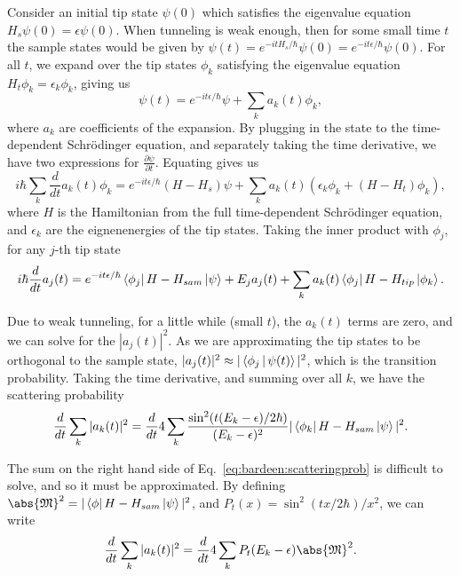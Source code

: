 \sloppy Consider an initial tip state $\psi(0)$ which satisfies the eigenvalue equation $H_{s}\psi(0) = \epsilon \psi(0)$. When tunneling is weak enough, then for some small time $t$ the sample states would be given by $\psi(t) = e^{-itH_{s}/\hbar} \psi(0) = e^{-it\epsilon/\hbar} \psi(0) $. For all $t$, we expand over the tip states $\phi_k$ satisfying the eigenvalue equation $H_{t}\phi_k = \epsilon_k \phi_k$, giving us
\begin{equation}
\psi(t) = e^{-it\epsilon/\hbar} \psi + \sum_k a_k(t) \phi_k,
\end{equation}
where $a_k$ are coefficients of the expansion. By plugging in the state to the time-dependent Schr\"odinger equation, and separately taking the time derivative, we have two expressions for $\frac{\partial \psi}{\partial t}$. Equating gives us
\begin{equation}
i\hbar \sum_k \frac{d}{dt} a_k(t) \phi_k = e^{-it\epsilon / \hbar} (H-H_{s})\psi + \sum_k a_k(t) (\epsilon_k \phi_k + (H-H_{t})\phi_k),
\end{equation}
where $H$ is the Hamiltonian from the full time-dependent Schr\"odinger equation, and $\epsilon_k$ are the eignenenergies of the tip states. Taking the inner product with $\phi_j$, for any $j$-th tip state
\begin{equation} \label{eq:bardeen:scatteringprob}
i\hbar \frac{d}{dt} a_j(t) = e^{-it\epsilon/\hbar} \Bra{\phi_j}H-H_{sam} \Ket{\psi} + E_j a_j(t) + \sum_k a_k(t) \Bra{\phi_j} H - H_{tip} \Ket{\phi_k}.
\end{equation}

Due to weak tunneling, for a little while (small $t$), the $a_k(t)$ terms are zero, and we can solve for the $|a_j(t)|^2$. As we are approximating the tip states to be orthogonal to the sample state, $|a_j(t)|^2 \approx |\Braket{\phi_j|\psi(t)}|^2$, which is the transition probability. Taking the time derivative, and summing over all $k$, we have the scattering probability
\begin{equation}
\frac{d}{dt}\sum_k |a_k(t)|^2 = \frac{d}{dt} 4 \sum_k \frac{\sin^2 (t(E_k - \epsilon)/2\hbar)}{(E_k - \epsilon)^2} | \Bra{\phi_k} H-H_{sam} \Ket{\psi}  | ^2.
\end{equation}

The sum on the right hand side of Eq.~\ref{eq:bardeen:scatteringprob} is difficult to solve, and so it must be approximated. By defining $\abs{\mathfrak{M}}^2 = |\Bra{\phi} H-H_{sam} \Ket{\psi}| ^2$, and $P_t(x) = \sin^2(tx/2\hbar)/x^2$, we can write
\begin{equation}
\frac{d}{dt}\sum_k |a_k(t)|^2 = \frac{d}{dt} 4 \sum_k P_t(E_k - \epsilon) \abs{\mathfrak{M}}^2.
\end{equation}

